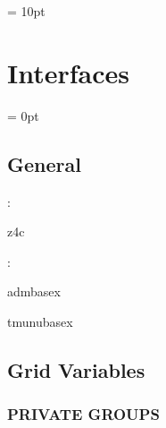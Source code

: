 \vspace{0.5cm}\parskip = 10pt 

\section{Interfaces} 


\parskip = 0pt

\vspace{3mm} \subsection*{General}

: 

z4c
\vspace{2mm}

: 

admbasex

tmunubasex
\vspace{2mm}
\subsection*{Grid Variables}
\vspace{5mm}\subsubsection{PRIVATE GROUPS}

\vspace{5mm}

